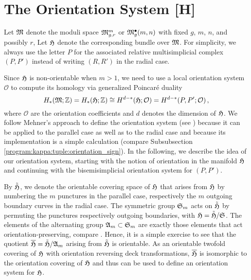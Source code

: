 \section{The Orientation System [H]}
\label{cellular_models:orientation}

Let $\M$ denote the moduli space $\Modspc[r]$ or $\ModspcRad$ with fixed $g$, $m$, $n$, and possibly $r$,
Let $\Har$ denote the corresponding bundle over $\M$.
For simplicity, we always use the letter $P$ for the associated relative multisimplicial complex $(P, P')$
instead of writing $(R, R')$ in the radial case.

Since $\Har$ is non-orientable when $m > 1$, 
we need to use a local orientation system $\mathcal O$ to compute its homology via generalized Poincaré duality
\[
   H_\ast( \M; \Z ) = H_\ast( \Har; \Z ) \cong H^{d-\ast}( \Har; \mathcal O ) = H^{d-\ast}( P, P'; \mathcal O)\,,
\]
where $\mathcal O$ are the orientation coefficients and $d$ denotes the dimension of $\Har$.
We follow Mehner's approach to define the orientation system (see \cite[Chapter 3.7]{Mehner201112}) because
it can be applied to the parallel case as well as to the radial case
and because its implementation is a simple calculation (compare Subsubsection \ref{program:kappa:tuple:orientation_sign}).
In the following, we describe the idea of our orientation system, starting with the notion of orientation in the manifold $\Har$
and continuing with the bisemisimplicial orientation system for $(P, P')$.

By $\tilde \Har$, we denote the orientable covering space of $\Har$ that arises from $\Har$ by numbering the $m$ punctures in the parallel case,
respectively the $m$ outgoing boundary curves in the radial case.
The symmetric group $\SymGr_m$ acts on $\tilde \Har$ by permuting the punctures respectively outgoing boundaries, 
with $\Har = \tilde \Har / \SymGr$.
The elements of the alternating group $\mathfrak A_m \subset \SymGr_m$ are exactly those elements that act orientation-preserving, compare \cite[Chapter 3.4]{Mehner201112}.
Hence, it is a simple exercise to see that the quotient $\overline \Har = \tilde \Har / \mathfrak A_m$ arising from $\tilde \Har$ is orientable.
As an orientable twofold covering of $\Har$ with orientation reversing deck transformations, 
$\overline \Har$ is isomorphic to the orientation covering of $\Har$ and thus can be used to define an orientation system for $\Har$.

